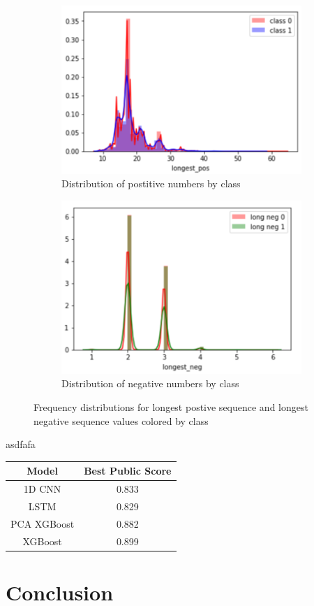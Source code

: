 \documentclass[11pt,letterpaper]{article}
\begin{document}
\begin{figure}[h!]
    \centering
    \begin{subfigure}[]{.4\textwidth}
        \includegraphics[width=\textwidth]{long_pos_dist.png}
        \caption{Distribution of postitive numbers by class}
        \label{fig:pos_dist}
    \end{subfigure}
    \begin{subfigure}[]{.4\textwidth}
        \includegraphics[width=\textwidth]{long_neg_dist.png}
        \caption{Distribution of negative numbers by class}
        \label{fig:neg_dist}
    \end{subfigure}
    \caption{Frequency distributions for longest postive sequence and longest
negative sequence values colored by class}
    \label{fig:count_dist}
\end{figure}

asdfafa

\begin{table}[h!]
\begin{tabular}{|c|c|}
\hline
Model & Best Public Score \\ \hline
1D CNN & 0.833 \\ \hline
LSTM & 0.829 \\ \hline
PCA XGBoost & 0.882 \\ \hline
XGBoost & 0.899 \\ \hline
\end{tabular}
\end{table}

\section{Conclusion}
\end{document}
